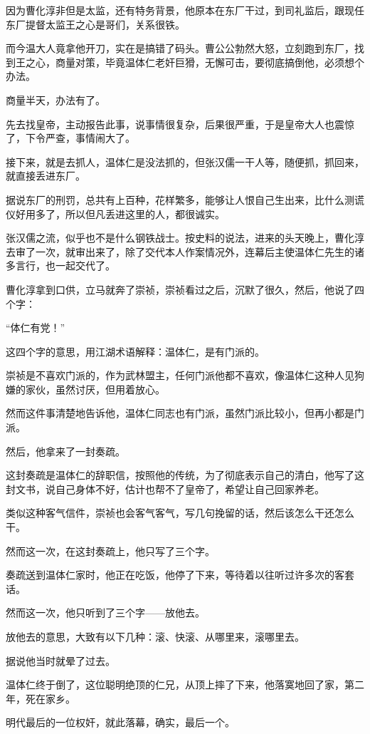 \begin{multicols}{\theparacolNo}
		因为曹化淳非但是太监，还有特务背景，他原本在东厂干过，到司礼监后，跟现任东厂提督太监王之心是哥们，关系很铁。

		而今温大人竟拿他开刀，实在是搞错了码头。曹公公勃然大怒，立刻跑到东厂，找到王之心，商量对策，毕竟温体仁老奸巨猾，无懈可击，要彻底搞倒他，必须想个办法。

		商量半天，办法有了。

		先去找皇帝，主动报告此事，说事情很复杂，后果很严重，于是皇帝大人也震惊了，下令严查，事情闹大了。

		接下来，就是去抓人，温体仁是没法抓的，但张汉儒一干人等，随便抓，抓回来，就直接丢进东厂。

		据说东厂的刑罚，总共有上百种，花样繁多，能够让人恨自己生出来，比什么测谎仪好用多了，所以但凡丢进这里的人，都很诚实。

		张汉儒之流，似乎也不是什么钢铁战士。按史料的说法，进来的头天晚上，曹化淳去审了一次，就审出来了，除了交代本人作案情况外，连幕后主使温体仁先生的诸多言行，也一起交代了。

		曹化淳拿到口供，立马就奔了崇祯，崇祯看过之后，沉默了很久，然后，他说了四个字：

		“体仁有党！”

		这四个字的意思，用江湖术语解释：温体仁，是有门派的。

		崇祯是不喜欢门派的，作为武林盟主，任何门派他都不喜欢，像温体仁这种人见狗嫌的家伙，虽然讨厌，但用着放心。

		然而这件事清楚地告诉他，温体仁同志也有门派，虽然门派比较小，但再小都是门派。

		然后，他拿来了一封奏疏。

		这封奏疏是温体仁的辞职信，按照他的传统，为了彻底表示自己的清白，他写了这封文书，说自己身体不好，估计也帮不了皇帝了，希望让自己回家养老。

		类似这种客气信件，崇祯也会客气客气，写几句挽留的话，然后该怎么干还怎么干。

		然而这一次，在这封奏疏上，他只写了三个字。

		奏疏送到温体仁家时，他正在吃饭，他停了下来，等待着以往听过许多次的客套话。

		然而这一次，他只听到了三个字——放他去。

		放他去的意思，大致有以下几种：滚、快滚、从哪里来，滚哪里去。

		据说他当时就晕了过去。

		温体仁终于倒了，这位聪明绝顶的仁兄，从顶上摔了下来，他落寞地回了家，第二年，死在家乡。

		明代最后的一位权奸，就此落幕，确实，最后一个。
		\ifnum{}
	\end{multicols}
\fi
\newpage
